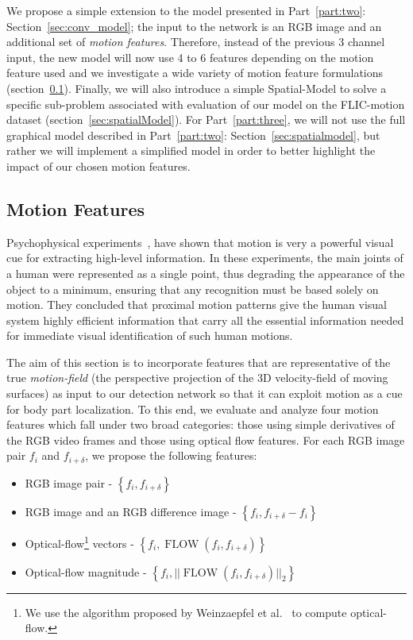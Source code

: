 We propose a simple extension to the model presented in Part~\ref{part:two}: Section~\ref{sec:conv_model}; the input to the network is an RGB image and an additional set of  \emph{motion features}. Therefore, instead of the previous 3 channel input, the new model will now use 4 to 6 features depending on the motion feature used and we investigate a wide variety of motion feature formulations (section~\ref{sec:motionFeats}).  Finally, we will also introduce a simple Spatial-Model to solve a specific sub-problem associated with evaluation of our model on the FLIC-motion dataset (section~\ref{sec:spatialModel}). For Part~\ref{part:three}, we will not use the full graphical model described in Part~\ref{part:two}: Section~\ref{sec:spatialmodel}, but rather we will implement a simplified model in order to better highlight the impact of our chosen motion features.

\subsection{Motion Features}
\label{sec:motionFeats}

Psychophysical experiments~\cite{biologicalmotion}, have shown that motion is very a powerful visual cue for extracting high-level information. In these experiments, the main joints of a human were represented as a single point, thus degrading the appearance of the object to a minimum, ensuring that any recognition must be based solely on motion. They concluded that proximal motion patterns give the human visual system highly efficient information that carry all the essential information needed for immediate visual identification of such human motions.

The aim of this section is to incorporate features that are representative of the true \emph{motion-field} (the perspective projection of the 3D velocity-field of moving surfaces) as input to our detection network so that it can exploit motion as a cue for body part localization. To this end, we evaluate and analyze four motion features which fall under two broad categories: those using simple derivatives of the RGB video frames and those using optical flow features.  For each RGB image pair $f_{i}$ and $f_{i+\delta}$, we propose the following features:

\begin{itemize}
\item RGB image pair - $\left\{f_{i}, f_{i+\delta}\right\}$
\item RGB image and an RGB difference image - $\left\{f_{i}, f_{i+\delta} - f_{i}\right\}$
\item Optical-flow\footnote{We use the algorithm proposed by Weinzaepfel et al.~\cite{deepflow} to compute optical-flow.} vectors - $\left\{f_{i},\operatorname{FLOW}(f_{i}, f_{i+\delta})\right\}$
\item Optical-flow magnitude - $\left\{f_{i},||\operatorname{FLOW}(f_{i}, f_{i+\delta})||_2\right\}$
\end{itemize}

